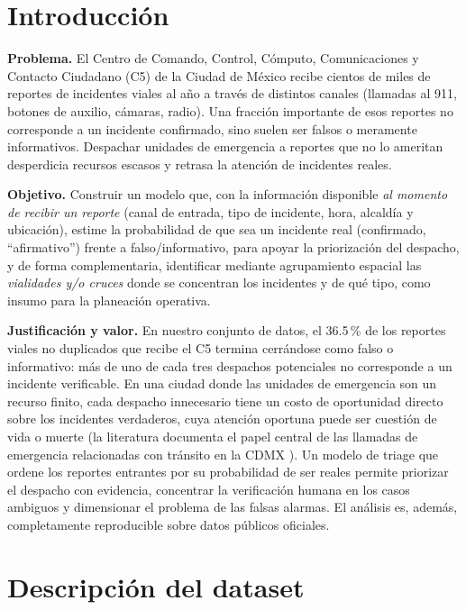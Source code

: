 \documentclass[11pt,letterpaper]{article}
\begin{document}
\section{Introducción}

\textbf{Problema.} El Centro de Comando, Control, Cómputo, Comunicaciones y
Contacto Ciudadano (C5) de la Ciudad de México recibe cientos de miles de
reportes de incidentes viales al año a través de distintos canales (llamadas al
911, botones de auxilio, cámaras, radio). Una fracción importante de esos
reportes no corresponde a un incidente confirmado, sino suelen ser falsos o meramente
informativos. Despachar unidades de emergencia a reportes que no lo ameritan
desperdicia recursos escasos y retrasa la atención de incidentes reales.

\textbf{Objetivo.} Construir un modelo que, con la información disponible
\emph{al momento de recibir un reporte} (canal de entrada, tipo de incidente,
hora, alcaldía y ubicación), estime la probabilidad de que sea un incidente
real (confirmado, ``afirmativo'') frente a falso/informativo, para apoyar la
priorización del despacho, y de forma complementaria, identificar mediante
agrupamiento espacial las \emph{vialidades y/o cruces} donde se concentran los incidentes
y de qué tipo, como insumo para la planeación operativa.

\textbf{Justificación y valor.} En nuestro conjunto de datos, el 36.5\,\% de
los reportes viales no duplicados que recibe el C5 termina cerrándose como
falso o informativo: más de uno de cada tres despachos potenciales no
corresponde a un incidente verificable. En una ciudad donde las unidades de
emergencia son un recurso finito, cada despacho innecesario tiene un costo de
oportunidad directo sobre los incidentes verdaderos, cuya atención oportuna
puede ser cuestión de vida o muerte (la literatura documenta el papel central
de las llamadas de emergencia relacionadas con tránsito en la CDMX
\cite{melgoza}). Un modelo de triage que ordene los reportes entrantes por su
probabilidad de ser reales permite priorizar el despacho con evidencia,
concentrar la verificación humana en los casos ambiguos y dimensionar el
problema de las falsas alarmas. El análisis es, además, completamente
reproducible sobre datos públicos oficiales.

\section{Descripción del dataset}
\end{document}
